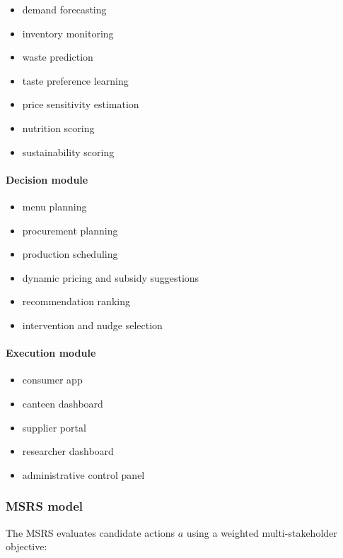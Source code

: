 \documentclass[journal]{IEEEtran}
\begin{document}
\begin{itemize}
\tightlist
\item
  demand forecasting
\item
  inventory monitoring
\item
  waste prediction
\item
  taste preference learning
\item
  price sensitivity estimation
\item
  nutrition scoring
\item
  sustainability scoring
\end{itemize}

\paragraph{Decision module}\label{decision-module}

\begin{itemize}
\tightlist
\item
  menu planning
\item
  procurement planning
\item
  production scheduling
\item
  dynamic pricing and subsidy suggestions
\item
  recommendation ranking
\item
  intervention and nudge selection
\end{itemize}

\paragraph{Execution module}\label{execution-module}

\begin{itemize}
\tightlist
\item
  consumer app
\item
  canteen dashboard
\item
  supplier portal
\item
  researcher dashboard
\item
  administrative control panel
\end{itemize}

\subsubsection{MSRS model}\label{msrs-model}

The MSRS evaluates candidate actions \(a\) using a weighted
multi-stakeholder objective:
\end{document}
